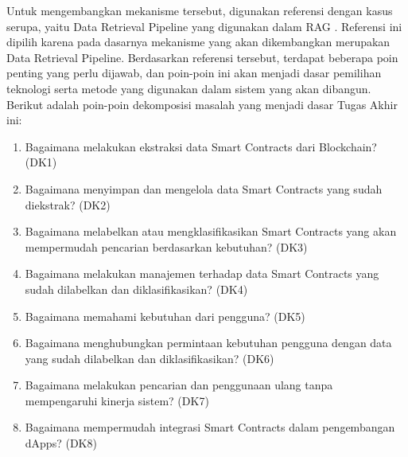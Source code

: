 
Untuk mengembangkan mekanisme tersebut, digunakan referensi dengan kasus serupa, yaitu Data Retrieval Pipeline yang digunakan dalam RAG \parencite{CrateDB_RAG_Pipelines}. Referensi ini dipilih karena pada dasarnya mekanisme yang akan dikembangkan merupakan Data Retrieval Pipeline. Berdasarkan referensi tersebut, terdapat beberapa poin penting yang perlu dijawab, dan poin-poin ini akan menjadi dasar pemilihan teknologi serta metode yang digunakan dalam sistem yang akan dibangun. Berikut adalah poin-poin dekomposisi masalah yang menjadi dasar Tugas Akhir ini:

\begin{enumerate}
  \item Bagaimana melakukan ekstraksi data Smart Contracts dari Blockchain? (DK1)
  \item Bagaimana menyimpan dan mengelola data Smart Contracts yang sudah diekstrak? (DK2)
  \item Bagaimana melabelkan atau mengklasifikasikan Smart Contracts yang akan mempermudah pencarian berdasarkan kebutuhan? (DK3)
  \item Bagaimana melakukan manajemen terhadap data Smart Contracts yang sudah dilabelkan dan diklasifikasikan? (DK4)
  \item Bagaimana memahami kebutuhan dari pengguna? (DK5)
  \item Bagaimana menghubungkan permintaan kebutuhan pengguna dengan data yang sudah dilabelkan dan diklasifikasikan? (DK6)
  \item Bagaimana melakukan pencarian dan penggunaan ulang tanpa mempengaruhi kinerja sistem? (DK7)
  \item Bagaimana mempermudah integrasi Smart Contracts dalam pengembangan dApps? (DK8)
\end{enumerate}

